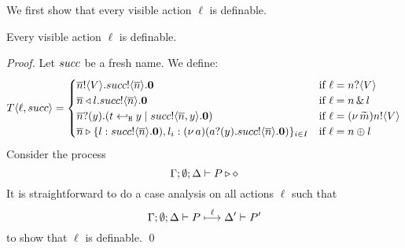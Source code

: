 We first show that every visible action $\ell$ is definable.

\begin{lemma}[Definability]
	\label{lem:definibility}
	Every visible action $\ell$ is definable.
\end{lemma}

\begin{proof}
	Let $succ$ be a fresh name. We define:
		\[
		T\langle \ell, succ \rangle =
		\begin{cases}
		\overline{n} ! \langle V \rangle . succ ! \langle \overline{n} \rangle . \mathbf{0} & \text{if $\ell = n ? \langle V \rangle$} \\
		\overline{n} \triangleleft l . succ ! \langle \overline{n} \rangle . \mathbf{0} & \text{if $\ell = n \,\&\, l$} \\
		\overline{n} ? (y) . (t \hookleftarrow_{\mathtt{H}} y \;|\; succ ! \langle \overline{n}, y \rangle . \mathbf{0}) & \text{if $\ell = (\nu\, \widetilde{m}) n ! \langle V \rangle$} \\
		\overline{n} \triangleright \{l: succ ! \langle \overline{n} \rangle . \mathbf{0}), l_i: (\nu\, a)(a ? (y) . succ ! \langle \overline{n} \rangle . \mathbf{0})\}_{i \in I} & \text{if $\ell = n \oplus l$} 
		\end{cases}
	\]
Consider the process 
	\[
		\Gamma; \emptyset; \Delta \vdash P \triangleright \diamond
	\]
	\noi	It is straightforward to do a case analysis
			on all actions $\ell$ such that
			\[
				\Gamma; \emptyset; \Delta \vdash P \stackrel{\ell}{\longmapsto} \Delta' \vdash P'
			\]
			to show that $\ell$ is definable.
	\qed
\end{proof}

